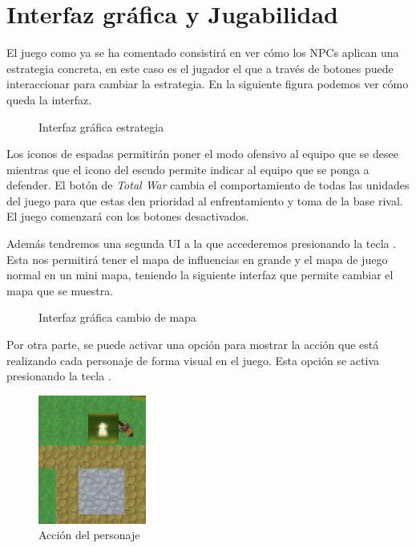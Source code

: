 \section{Interfaz gráfica y Jugabilidad}

El juego como ya se ha comentado consistirá en ver cómo los NPCs aplican una estrategia concreta, en este caso es el jugador el que a través de botones puede interaccionar para cambiar la estrategia. En la siguiente figura podemos ver cómo queda la interfaz.

\begin{figure}[H]
    \centering
    
    \caption{Interfaz gráfica estrategia}
    \label{fig:mainButtons}
\end{figure}

Los iconos de espadas permitirán poner el modo ofensivo al equipo que se desee mientras que el icono del escudo permite indicar al equipo que se ponga a defender. El botón de \textit{Total War} cambia el comportamiento de todas las unidades del juego para que estas den prioridad al enfrentamiento y toma de la base rival. El juego comenzará con los botones desactivados.

Además tendremos una segunda UI a la que accederemos presionando la tecla . Esta nos permitirá tener el mapa de influencias en grande y el mapa de juego normal en un mini mapa, teniendo la siguiente interfaz que permite cambiar el mapa que se muestra.

\begin{figure}[H]
    \centering
    \caption{Interfaz gráfica cambio de mapa}
    \label{fig:mainButtons}
\end{figure}

Por otra parte, se puede activar una opción para mostrar la acción que está realizando cada personaje de forma visual en el juego. Esta opción se activa presionando la tecla .

\begin{figure}[H]
    \centering
    \includegraphics{images/actionState.png}
    \caption{Acción del personaje}
    \label{fig:actionState}
\end{figure}

